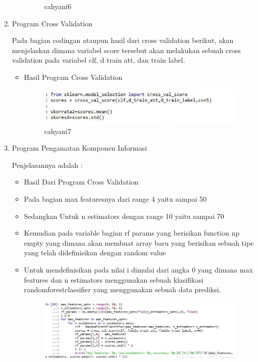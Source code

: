 \begin{enumerate}
\begin{itemize}
\begin{figure}[!hbtp]
\caption{cahyani6}
\label{cahyani6}
\end{figure}
\par
\end{itemize}
\par
\par
\item Program Cross Validation
\par Pada bagian codingan ataupun hasil dari cross validation berikut, akan menjelaskan dimana variabel score tersebut akan melakukan sebuah cross validation pada variabel clf, d train att, dan train label. 
\begin{itemize}
\item Hasil Program Cross Validation
\begin{figure}[!hbtp]
\centering
\includegraphics[scale=0.3]{figures/cahyani7.jpg}
\caption{cahyani7}
\label{cahyani7}
\end{figure}
\par
\end{itemize}
\par
\par
\item Program Pengamatan Komponen Informasi
\par Penjelasannya adalah :
\begin{itemize}
\item Hasil Dari Program Cross Validation
\par
\item Pada bagian max featuresnya dari range 4 yaitu sampai 50
\item Sedangkan Untuk n estimators dengan range 10 yaitu sampai 70
\item Kemudian pada variable bagian rf params yang berisikan function np empty yang dimana akan membuat array baru yang berisikan sebuah tipe yang telah didefinisikan dengan random value
\item Untuk mendefinisikan pada nilai i dimulai dari angka 0 yang dimana max features dan n estimators menggunakan sebuah  klasifikasi randomforestclassifier yang menggunakan sebuah data prediksi.
\begin{figure}[!hbtp]
\centering
\includegraphics[scale=0.3]{figures/cahyani8.jpeg}

\end{figure}
\end{itemize}
\end{enumerate}
